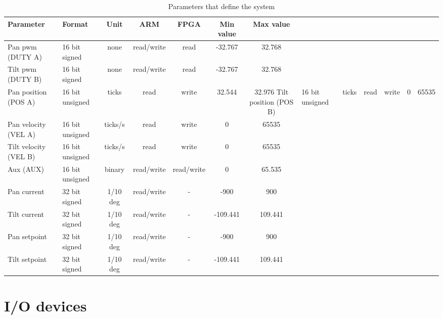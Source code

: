 \begin{table}[htb]				
	\begin{center}
	\begin{tabular}{l|l|c|c|c|c|c}			
	Parameter & Format & Unit & ARM & FPGA & Min value & Max value\\		
	\hline												
Pan pwm (DUTY A) &16 bit signed & none & read/write & read & -32.767 &  32.768  \\
Tilt pwm (DUTY B) & 16 bit signed  & none&read/write & read & -32.767 &  32.768 \\
Pan position (POS A) & 16 bit unsigned&ticks & read & write & 32.544 & 32.976
Tilt position (POS B) & 16 bit unsigned&ticks & read & write & 0 & 65535 \\
Pan velocity (VEL A) & 16 bit unsigned&ticks/s & read & write & 0 & 65535 \\
Tilt velocity (VEL B) & 16 bit unsigned & ticks/s&read & write & 0 & 65535 \\
Aux (AUX) & 16 bit unsigned &binary& read/write & read/write & 0 & 65.535 \\
Pan current & 32 bit signed & 1/10 deg & read/write & - & -900 & 900 \\
Tilt current  & 32 bit signed & 1/10 deg & read/write & - & -109.441 & 109.441 \\
Pan setpoint  & 32 bit signed & 1/10 deg & read/write & - & -900 & 900 \\
Tilt setpoint  & 32 bit signed & 1/10 deg & read/write & - & -109.441 & 109.441 \\
	\end{tabular}
	\end{center}
	\caption{Parameters that define the system}				
	\label{tab:parameters}			
\end{table}


\section{I/O devices}\label{sec:iodevices}

